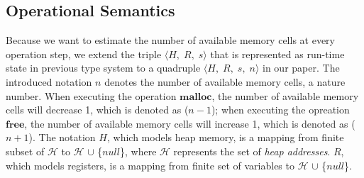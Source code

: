\documentclass[english]{jssst_ppl} %
\newcommand\coma{,\;}
\newcommand\Malloc{\mathbf{malloc}}
\newcommand\Free{\mathbf{free}}
\begin{document}
\subsection{Operational Semantics}
Because we want to estimate the number of available memory cells at every operation step, we extend the triple $\langle H\coma R\coma s \rangle$ that is represented as run-time state in previous type system to a quadruple $\langle H\coma R\coma s\coma n \rangle$ in our paper. The introduced notation $n$ denotes the number of available memory cells, a nature number. When executing the operation $\Malloc$, the number of available memory cells will decrease 1, which is denoted as ($n - 1$); when executing the opreation $\Free$, the number of available memory cells will increase 1, which is denoted as ($n + 1$). The notation $H$, which models heap memory, is a mapping from finite subset of $\mathcal{H}$ to $\mathcal{H}$ $\cup$ \{$null$\}, where $\mathcal{H}$ represents the set of \emph{heap addresses}. $R$, which models registers, is a mapping from finite set of variables to $\mathcal{H}$ $\cup$ \{$null$\}.
\end{document}
